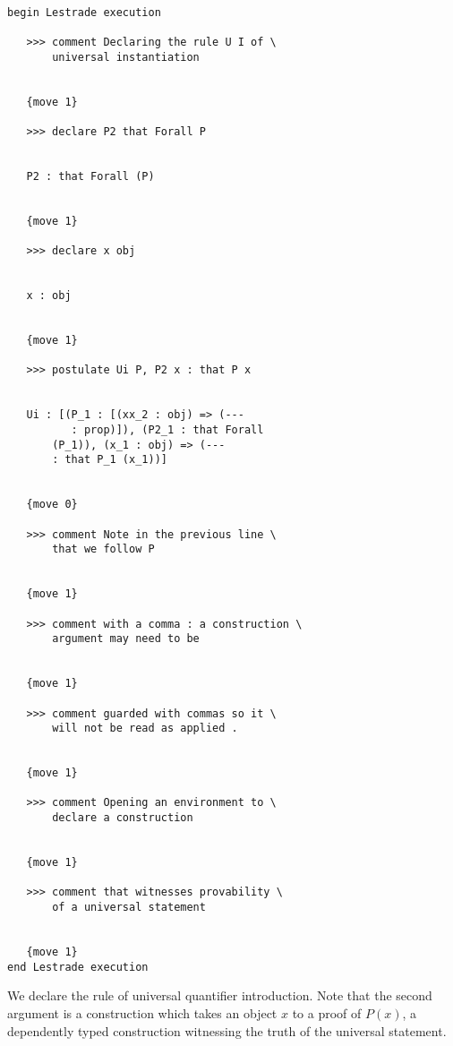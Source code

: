 \documentclass[12pt]{article}
\begin{document}
\begin{verbatim}

begin Lestrade execution

   >>> comment Declaring the rule U I of \
       universal instantiation


   {move 1}

   >>> declare P2 that Forall P


   P2 : that Forall (P)


   {move 1}

   >>> declare x obj


   x : obj


   {move 1}

   >>> postulate Ui P, P2 x : that P x


   Ui : [(P_1 : [(xx_2 : obj) => (--- 
          : prop)]), (P2_1 : that Forall 
       (P_1)), (x_1 : obj) => (--- 
       : that P_1 (x_1))]


   {move 0}

   >>> comment Note in the previous line \
       that we follow P


   {move 1}

   >>> comment with a comma : a construction \
       argument may need to be


   {move 1}

   >>> comment guarded with commas so it \
       will not be read as applied .


   {move 1}

   >>> comment Opening an environment to \
       declare a construction


   {move 1}

   >>> comment that witnesses provability \
       of a universal statement


   {move 1}
end Lestrade execution
\end{verbatim}

We declare the rule of universal quantifier introduction.  Note that the second argument is a construction which takes an object $x$ to a proof of $P(x)$, a dependently typed construction witnessing the truth of the universal statement.
\end{document}
